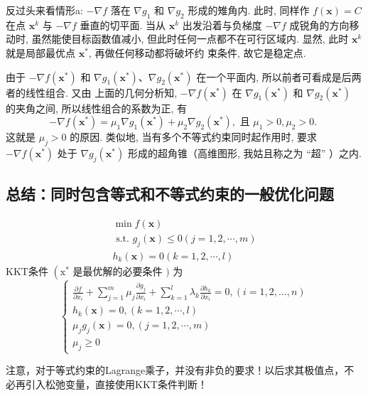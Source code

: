 反过头来看情形a: $ -\nabla f $ 落在 $ \nabla g_{1} $ 和 $ \nabla g_{2} $ 形成的雉角内. 此时, 同样作 $ f(\mathbf{x})=C $ 在点 $ \mathbf{x}^{k} $ 与 $ -\nabla f $ 垂直的切平面. 当从 $ \mathbf{x}^{k} $ 出发沿着与负梯度 $ -\nabla f $ 成锐角的方向移动时, 虽然能使目标函数值减小, 但此时任何一点都不在可行区域内. 显然, 此时 $ \mathbf{x}^{k} $ 就是局部最优点 $ \mathbf{x}^{*} $, 再做任何移动都将破坏约 束条件, 故它是稳定点.

由于 $ -\nabla f\left(\mathbf{x}^{*}\right) $ 和 $ \nabla g_{1}\left(\mathbf{x}^{*}\right) 、 \nabla g_{2}\left(\mathbf{x}^{*}\right) $ 在一个平面内, 所以前者可看成是后两者的线性组合. 又由 上面的几何分析知, $ -\nabla f\left(\mathbf{x}^{*}\right) $ 在 $ \nabla g_{1}\left(\mathbf{x}^{*}\right) $ 和 $ \nabla g_{2}\left(\mathbf{x}^{*}\right) $ 的夹角之间, 所以线性组合的系数为正, 有
$$
-\nabla f\left(\mathbf{x}^{*}\right)=\mu_{1} \nabla g_{1}\left(\mathbf{x}^{*}\right)+\mu_{2} \nabla g_{2}\left(\mathbf{x}^{*}\right), \text { 且 } \mu_{1}>0, \mu_{2}>0 \text {. }
$$
这就是 $ \mu_{j}>0 $ 的原因. 类似地, 当有多个不等式约束同时起作用时, 要求 $ -\nabla f\left(\mathbf{x}^{*}\right) $ 处于 $ \nabla g_{j}\left(\mathbf{x}^{*}\right) $ 形成的超角锥（高维图形, 我姑且称之为 “超” ）之内.

\subsection{总结：同时包含等式和不等式约束的一般优化问题}

$$
\begin{array}{l}
\min f(\mathbf{x}) \\
\text { s.t. } g_{j}(\mathbf{x}) \leq 0(j=1,2, \cdots, m) \\
h_{k}(\mathbf{x})=0(k=1,2, \cdots, l)
\end{array}
$$
KKT条件 $ \left(\mathrm{x}^{*}\right. $ 是最优解的必要条件 $ ) $ 为
$$
\left\{\begin{array}{l}
\frac{\partial f}{\partial x_{i}}+\sum_{j=1}^{m} \mu_{j} \frac{\partial g_{j}}{\partial x_{i}}+\sum_{k=1}^{l} \lambda_{k} \frac{\partial h_{k}}{\partial x_{i}}=0,(i=1,2, \ldots, n) \\
h_{k}(\mathbf{x})=0,(k=1,2, \cdots, l) \\
\mu_{j} g_{j}(\mathbf{x})=0,(j=1,2, \cdots, m) \\
\mu_{j} \geq 0
\end{array}\right.
$$

注意，对于等式约束的Lagrange乘子，并没有非负的要求！以后求其极值点，不必再引入松弛变量，直接使用KKT条件判断！